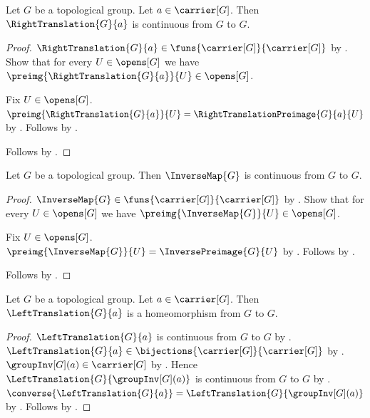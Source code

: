 \begin{theorem}\label{right_translation_continuous}
    Let $G$ be a topological group.
    Let $a\in\carrier[G]$.
    Then $\RightTranslation{G}{a}$ is continuous from $G$ to $G$.
\end{theorem}
\begin{proof}
    $\RightTranslation{G}{a}\in
        \funs{\carrier[G]}{\carrier[G]}$
        by .
    Show that for every $U\in\opens[G]$ we have
        $\preimg{\RightTranslation{G}{a}}{U}\in\opens[G]$.
    \begin{subproof}
        Fix $U\in\opens[G]$.
        $\preimg{\RightTranslation{G}{a}}{U}
            =\RightTranslationPreimage{G}{a}{U}$
            by .
        Follows by .
    \end{subproof}
    Follows by .
\end{proof}

\begin{theorem}\label{inverse_map_continuous}
    Let $G$ be a topological group.
    Then $\InverseMap{G}$ is continuous from $G$ to $G$.
\end{theorem}
\begin{proof}
    $\InverseMap{G}\in\funs{\carrier[G]}{\carrier[G]}$
        by .
    Show that for every $U\in\opens[G]$ we have
        $\preimg{\InverseMap{G}}{U}\in\opens[G]$.
    \begin{subproof}
        Fix $U\in\opens[G]$.
        $\preimg{\InverseMap{G}}{U}=\InversePreimage{G}{U}$
            by .
        Follows by .
    \end{subproof}
    Follows by .
\end{proof}

\begin{theorem}\label{left_translation_homeomorphism}
    Let $G$ be a topological group.
    Let $a\in\carrier[G]$.
    Then $\LeftTranslation{G}{a}$ is a homeomorphism from $G$ to $G$.
\end{theorem}
\begin{proof}
    $\LeftTranslation{G}{a}$ is continuous from $G$ to $G$
        by .
    $\LeftTranslation{G}{a}\in
        \bijections{\carrier[G]}{\carrier[G]}$
        by .
    $\groupInv[G](a)\in\carrier[G]$ by .
    Hence $\LeftTranslation{G}{\groupInv[G](a)}$ is continuous
        from $G$ to $G$ by .
    $\converse{\LeftTranslation{G}{a}}
        =\LeftTranslation{G}{\groupInv[G](a)}$
        by .
    Follows by .
\end{proof}

